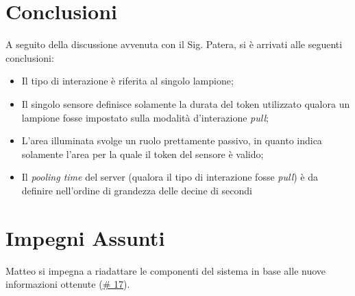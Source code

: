 \documentclass[a4paper, 12pt]{article}
\begin{document}
\section*{Conclusioni}
A seguito della discussione avvenuta con il Sig. Patera, si è arrivati alle seguenti conclusioni:
\begin{itemize}
    \item Il tipo di interazione è riferita al singolo lampione;
    \item Il singolo sensore definisce solamente la durata del token utilizzato qualora un lampione fosse impostato sulla modalità d'interazione \textit{pull};
    \item L'area illuminata svolge un ruolo prettamente passivo, in quanto indica solamente l'area per la quale il token del sensore è valido;
    \item Il \textit{pooling time} del server (qualora il tipo di interazione fosse \textit{pull}) è da definire nell'ordine di grandezza delle decine di secondi
\end{itemize}

\section*{Impegni Assunti}
Matteo si impegna a riadattare le componenti del sistema in base alle nuove informazioni ottenute (\href{https://github.com/4ourSquared/LumosMinima-code/issues/17}{\# 17}). 
\end{document}
